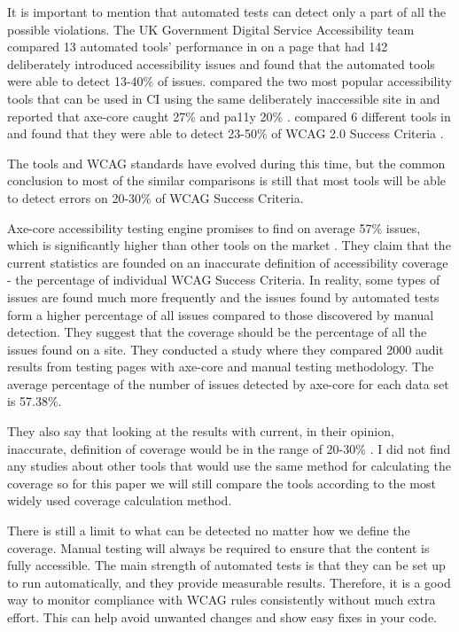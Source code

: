 \documentclass{master_thesis}
\begin{document}
It is important to mention that automated tests can detect only a part of all the possible violations. The UK Government Digital Service Accessibility team compared 13 automated tools' performance in \citeyear{GAT2018} on a page that had 142 deliberately introduced accessibility issues and found that the automated tools were able to detect 13-40\% of issues. \citeauthor{Abbott2021} compared the two most popular accessibility tools that can be used in CI using the same deliberately inaccessible site in \citeyear{Abbott2021} and reported that axe-core caught 27\% and pa11y 20\% \citep{Abbott2021}. \citeauthor{Vigo2013} compared 6 different tools in \citeyear{Vigo2013} and found that they were able to detect 23-50\% of  WCAG 2.0 Success Criteria \citep{GAT2018, Abbott2021, Vigo2013}.

The tools and WCAG standards have evolved during this time, but the common conclusion to most of the similar comparisons is still that most tools will be able to detect errors on 20-30\% of WCAG Success Criteria. 

Axe-core accessibility testing engine promises to find on average 57\% issues, which is significantly higher than other tools on the market \citep{Deque2023}. They claim that the current statistics are founded on an inaccurate definition of accessibility coverage - the percentage of individual WCAG Success Criteria. In reality, some types of issues are found much more frequently and the issues found by automated tests form a higher percentage of all issues compared to those discovered by manual detection. They suggest that the coverage should be the percentage of all the issues found on a site. They conducted a study where they compared 2000 audit results from testing pages with axe-core and manual testing methodology. The average percentage of the number of issues detected by axe-core for each data set is 57.38\%.

They also say that looking at the results with current, in their opinion, inaccurate, definition of coverage would be in the range of 20-30\% \citep{DequeSystems2021report}. I did not find any studies about other tools that would use the same method for calculating the coverage so for this paper we will still compare the tools according to the most widely used coverage calculation method.

There is still a limit to what can be detected no matter how we define the coverage. Manual testing will always be required to ensure that the content is fully accessible. The main strength of automated tests is that they can be set up to run automatically, and they provide measurable results. Therefore, it is a good way to monitor compliance with WCAG rules consistently without much extra effort. This can help avoid unwanted changes and show easy fixes in your code.

\end{document}
